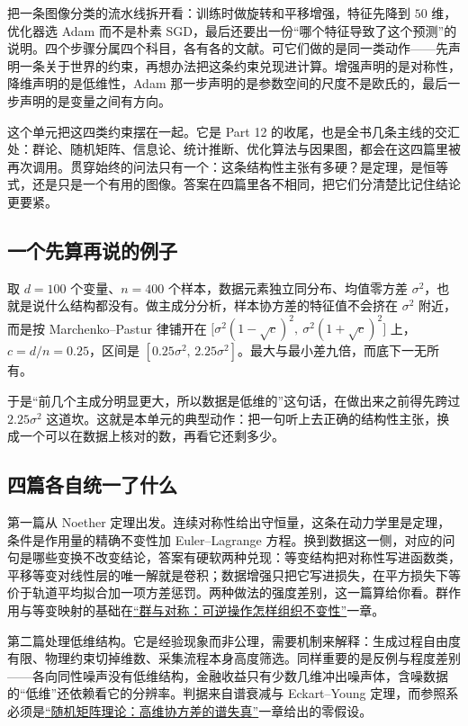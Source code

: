 把一条图像分类的流水线拆开看：训练时做旋转和平移增强，特征先降到 \(50\) 维，优化器选 Adam 而不是朴素 SGD，最后还要出一份``哪个特征导致了这个预测''的说明。四个步骤分属四个科目，各有各的文献。可它们做的是同一类动作——先声明一条关于世界的约束，再想办法把这条约束兑现进计算。增强声明的是对称性，降维声明的是低维性，Adam 那一步声明的是参数空间的尺度不是欧氏的，最后一步声明的是变量之间有方向。

这个单元把这四类约束摆在一起。它是 Part 12 的收尾，也是全书几条主线的交汇处：群论、随机矩阵、信息论、统计推断、优化算法与因果图，都会在这四篇里被再次调用。贯穿始终的问法只有一个：这条结构性主张有多硬？是定理，是恒等式，还是只是一个有用的图像。答案在四篇里各不相同，把它们分清楚比记住结论更要紧。

\subsection{一个先算再说的例子}

取 \(d=100\) 个变量、\(n=400\) 个样本，数据元素独立同分布、均值零方差 \(\sigma^2\)，也就是说什么结构都没有。做主成分分析，样本协方差的特征值不会挤在 \(\sigma^2\) 附近，而是按 Marchenko--Pastur 律铺开在 \(\big[\sigma^2(1-\sqrt c)^2,\ \sigma^2(1+\sqrt c)^2\big]\) 上，\(c=d/n=0.25\)，区间是 \([0.25\sigma^2,\,2.25\sigma^2]\)。最大与最小差九倍，而底下一无所有。

于是``前几个主成分明显更大，所以数据是低维的''这句话，在做出来之前得先跨过 \(2.25\sigma^2\) 这道坎。这就是本单元的典型动作：把一句听上去正确的结构性主张，换成一个可以在数据上核对的数，再看它还剩多少。

\subsection{四篇各自统一了什么}

第一篇从 Noether 定理出发。连续对称性给出守恒量，这条在动力学里是定理，条件是作用量的精确不变性加 Euler--Lagrange 方程。换到数据这一侧，对应的问句是哪些变换不改变结论，答案有硬软两种兑现：等变结构把对称性写进函数类，平移等变对线性层的唯一解就是卷积；数据增强只把它写进损失，在平方损失下等价于轨道平均拟合加一项方差惩罚。两种做法的强度差别，这一篇算给你看。群作用与等变映射的基础在\hyperref[ch:032]{``群与对称：可逆操作怎样组织不变性''}一章。

第二篇处理低维结构。它是经验现象而非公理，需要机制来解释：生成过程自由度有限、物理约束切掉维数、采集流程本身高度筛选。同样重要的是反例与程度差别——各向同性噪声没有低维结构，金融收益只有少数几维冲出噪声体，含噪数据的``低维''还依赖看它的分辨率。判据来自谱衰减与 Eckart--Young 定理，而参照系必须是\hyperref[ch:094]{``随机矩阵理论：高维协方差的谱失真''}一章给出的零假设。


